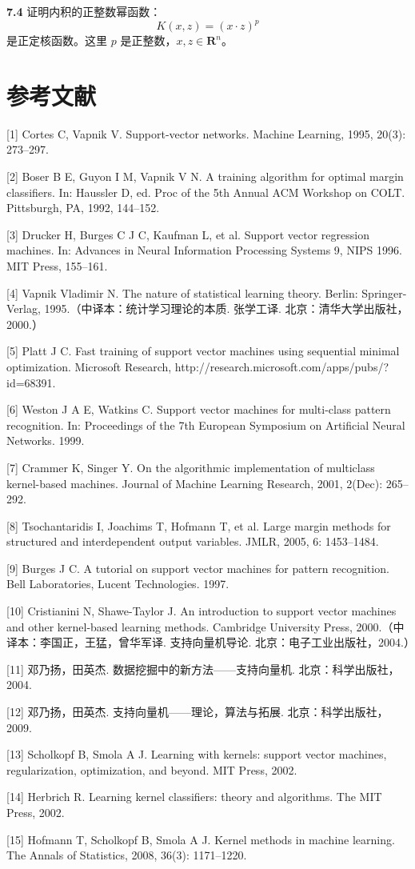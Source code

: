 \documentclass[UTF8,12pt,a4paper,fontset=fandol]{ctexart}
\begin{document}
\noindent\textbf{7.4}\quad
证明内积的正整数幂函数：
\[
K(x,z)=(x\cdot z)^p
\]
是正定核函数。这里 $p$ 是正整数，$x,z\in\mathbf{R}^n$。

\section*{参考文献}

[1] Cortes C, Vapnik V. Support-vector networks. Machine Learning, 1995, 20(3): 273--297.

[2] Boser B E, Guyon I M, Vapnik V N. A training algorithm for optimal margin classifiers. In: Haussler D, ed. Proc of the 5th Annual ACM Workshop on COLT. Pittsburgh, PA, 1992, 144--152.

[3] Drucker H, Burges C J C, Kaufman L, et al. Support vector regression machines. In: Advances in Neural Information Processing Systems 9, NIPS 1996. MIT Press, 155--161.

[4] Vapnik Vladimir N. The nature of statistical learning theory. Berlin: Springer-Verlag, 1995.（中译本：统计学习理论的本质. 张学工译. 北京：清华大学出版社，2000.）

[5] Platt J C. Fast training of support vector machines using sequential minimal optimization. Microsoft Research, http://research.microsoft.com/apps/pubs/?id=68391.

[6] Weston J A E, Watkins C. Support vector machines for multi-class pattern recognition. In: Proceedings of the 7th European Symposium on Artificial Neural Networks. 1999.

[7] Crammer K, Singer Y. On the algorithmic implementation of multiclass kernel-based machines. Journal of Machine Learning Research, 2001, 2(Dec): 265--292.

[8] Tsochantaridis I, Joachims T, Hofmann T, et al. Large margin methods for structured and interdependent output variables. JMLR, 2005, 6: 1453--1484.

[9] Burges J C. A tutorial on support vector machines for pattern recognition. Bell Laboratories, Lucent Technologies. 1997.

[10] Cristianini N, Shawe-Taylor J. An introduction to support vector machines and other kernel-based learning methods. Cambridge University Press, 2000.（中译本：李国正，王猛，曾华军译. 支持向量机导论. 北京：电子工业出版社，2004.）

[11] 邓乃扬，田英杰. 数据挖掘中的新方法——支持向量机. 北京：科学出版社，2004.

[12] 邓乃扬，田英杰. 支持向量机——理论，算法与拓展. 北京：科学出版社，2009.

[13] Scholkopf B, Smola A J. Learning with kernels: support vector machines, regularization, optimization, and beyond. MIT Press, 2002.

[14] Herbrich R. Learning kernel classifiers: theory and algorithms. The MIT Press, 2002.

[15] Hofmann T, Scholkopf B, Smola A J. Kernel methods in machine learning. The Annals of Statistics, 2008, 36(3): 1171--1220.
\end{document}
